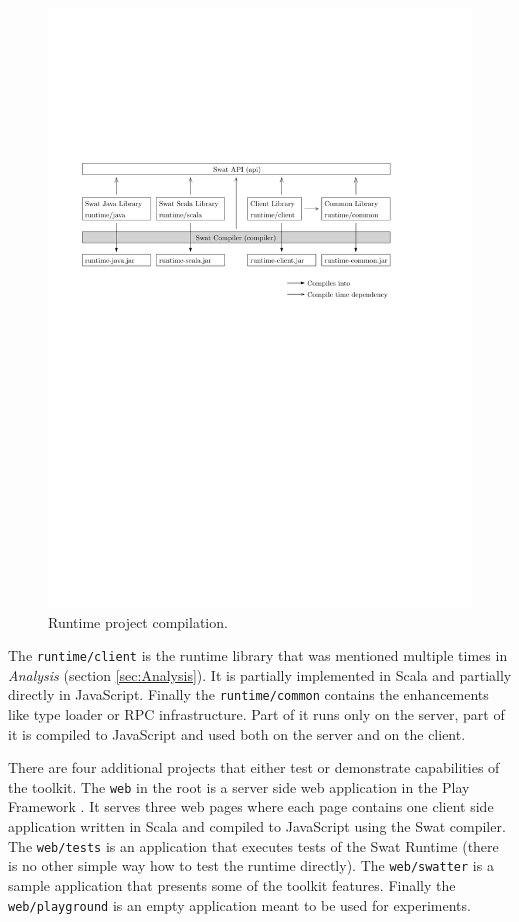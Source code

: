 \documentclass[12pt,a4paper]{report}
\begin{document}
\begin{figure}[ht]
  \centering
	\includegraphics[width=\linewidth,height=\textheight,keepaspectratio]{img/RuntimeCompilation.pdf}
	\caption{Runtime project compilation.}
	\label{RuntimeCompilation}
\end{figure}

The \texttt{runtime/client} is the runtime library that was mentioned multiple times in {\it Analysis} (section \ref{sec:Analysis}). It is partially implemented in Scala and partially directly in JavaScript. Finally the \texttt{runtime/common} contains the enhancements like type loader or RPC infrastructure. Part of it runs only on the server, part of it is compiled to JavaScript and used both on the server and on the client.

There are four additional projects that either test or demonstrate capabilities of the toolkit. The \texttt{web} in the root is a server side web application in the Play Framework \cite{Play}. It serves three web pages where each page contains one client side application written in Scala and compiled to JavaScript using the Swat compiler. The \texttt{web/tests} is an application that executes tests of the Swat Runtime (there is no other simple way how to test the runtime directly). The \texttt{web/swatter} is a sample application that presents some of the toolkit features. Finally the \texttt{web/playground} is an empty application meant to be used for experiments.
\end{document}
